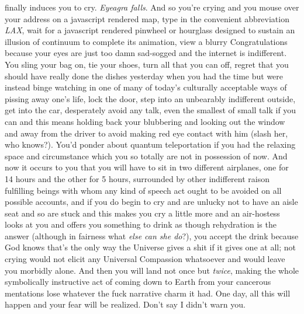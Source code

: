 \documentclass{article}
\begin{document}
finally induces you to cry. \textit{Eyeagra falls}. And so you're crying
and you mouse over your address on a javascript rendered map, type in
the convenient abbreviation \textit{LAX}, wait for a javascript rendered
pinwheel or hourglass designed to sustain an illusion of continuum to
complete its animation, view a blurry Congratulations because your eyes
are just too damn sad-sogged and the internet is indifferent. You sling
your bag on, tie your shoes, turn all that you can off, regret that you
should have really done the dishes yesterday when you had the time but
were instead binge watching in one of many of today's culturally
acceptable ways of pissing away one's life, lock the door, step into an
unbearably indifferent outside, get into the car, desperately avoid any
talk, even the smallest of small talk if you can and this means holding
back your blubbering and looking out the window and away from the driver
to avoid making red eye contact with him (slash her, who knows?). You'd
ponder about quantum teleportation if you had the relaxing space and
circumstance which you so totally are not in possession of now. And now
it occurs to you that you will have to sit in two different airplanes,
one for 14 hours and the other for 5 hours, surrounded by other
indifferent raison fulfilling beings with whom any kind of speech act
ought to be avoided on all possible accounts, and if you do begin to cry
and are unlucky not to have an aisle seat and so are stuck and this
makes you cry a little more and an air-hostess looks at you and offers
you something to drink as though rehydration is the answer (although in
fairness what \textit{else can she do}?), you accept the drink because
God knows that's the only way the Universe gives a shit if it gives one
at all; not crying would not elicit any Universal Compassion whatsoever
and would leave you morbidly alone. And then you will land not once but
\textit{twice}, making the whole symbolically instructive act of coming
down to Earth from your cancerous mentations lose whatever the fuck
narrative charm it had. One day, all this will happen and your fear will
be realized. Don't say I didn't warn you.
\end{document}
